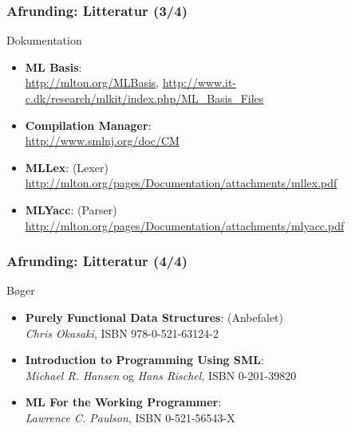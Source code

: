 \documentclass[slidestop,compress,mathserif, xcolor=table]{beamer}
\begin{document}
\begin{frame}
  \frametitle{Afrunding: Litteratur \quad (3/4)}
    Dokumentation
    \begin{itemize}
    \item \textbf{ML Basis}:\\
      {\scriptsize\url{http://mlton.org/MLBasis},
        \url{http://www.it-c.dk/research/mlkit/index.php/ML_Basis_Files}}
    \item \textbf{Compilation Manager}:\\
      {\scriptsize\url{http://www.smlnj.org/doc/CM}}
    \item \textbf{MLLex}: (Lexer)\\
      {\scriptsize\url{http://mlton.org/pages/Documentation/attachments/mllex.pdf}}
    \item \textbf{MLYacc}: (Parser)\\
      {\scriptsize\url{http://mlton.org/pages/Documentation/attachments/mlyacc.pdf}}
    \end{itemize}
\end{frame}

\begin{frame}
  \frametitle{Afrunding: Litteratur \quad (4/4)}
    Bøger
    \begin{itemize}
    \item \textbf{Purely Functional Data Structures}: (Anbefalet)\\
      \textit{Chris Okasaki}, ISBN 978-0-521-63124-2
    \item \textbf{Introduction to Programming Using SML}:\\
      \textit{Michael R. Hansen} og \textit{Hans Rischel}, ISBN 0-201-39820
    \item \textbf{ML For the Working Programmer}:\\
      \textit{Lawrence C. Paulson}, ISBN 0-521-56543-X
    \end{itemize}
  \end{frame}
\end{document}
